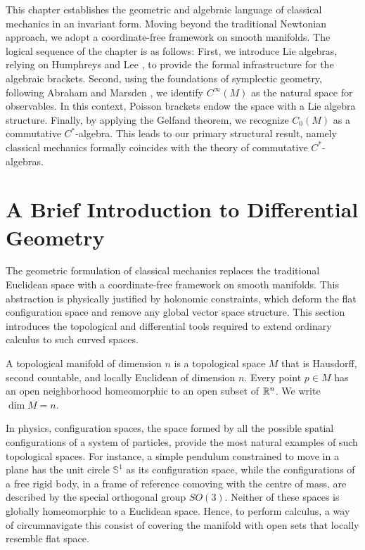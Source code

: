 
\setcounter{chapter}{1}


\noindent This chapter establishes the geometric and algebraic language of classical mechanics in an invariant form. Moving beyond the traditional Newtonian approach, we adopt a coordinate-free framework on smooth manifolds. The logical sequence of the chapter is as follows: First, we introduce Lie algebras, relying on Humphreys \cite{humphreysIntroductionLieAlgebras2010} and Lee \cite{leeIntroductionSmoothManifolds2013}, to provide the formal infrastructure for the algebraic brackets. Second, using the foundations of symplectic geometry, following Abraham and Marsden \cite{abrahamFoundationsMechanics2008}, we identify $C^\infty(M)$ as the natural space for observables. In this context, Poisson brackets endow the space with a Lie algebra structure. Finally, by applying the Gelfand theorem, we recognize $C_0(M)$ as a commutative $C^*$-algebra. This leads to our primary structural result, namely classical mechanics formally coincides with the theory of commutative $C^*$-algebras.

\section{A Brief Introduction to Differential Geometry}

The geometric formulation of classical mechanics replaces the traditional Euclidean space with a coordinate-free framework on smooth manifolds. This abstraction is physically justified by holonomic constraints, which deform the flat configuration space and remove any global vector space structure. This section introduces the topological and differential tools required to extend ordinary calculus to such curved spaces.

\begin{definition}\label{def:top-man}
	A topological manifold of dimension $n$ is a topological space $M$ that is Hausdorff, second countable, and locally Euclidean of dimension $n$. Every point $p \in M$ has an open neighborhood homeomorphic to an open subset of $\mathbb{R}^n$. We write $\dim M = n$.
\end{definition}

In physics, configuration spaces, the space formed by all the possible spatial configurations of a system of particles, provide the most natural examples of such topological spaces. For instance, a simple pendulum constrained to move in a plane has the unit circle $\mathbb{S}^1$ as its configuration space, while the configurations of a free rigid body, in a frame of reference comoving with the centre of mass, are described by the special orthogonal group $SO(3)$. Neither of these spaces is globally homeomorphic to a Euclidean space. Hence, to perform calculus, a way of circumnavigate this consist of covering the manifold with open sets that locally resemble flat space.

